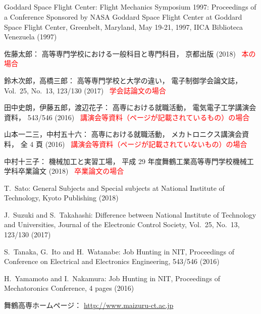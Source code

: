 \begin{center}
\section*{}                      %
\vspace*{-2zh}
\end{center}

\begin{thebibliography}{99}
	Goddard Space Flight Center:
	Flight Mechanics Symposium 1997: Proceedings of a Conference Sponsored by NASA Goddard
	 Space Flight Center at Goddard Space Flight Center, Greenbelt, Maryland, May 19-21, 1997,
	 IICA Biblioteca Venezuela (1997)

	佐藤太郎：
	高等専門学校における一般科目と専門科目，
	京都出版 (2018)
	\textcolor{red}{\quad\cdotfill\ 本の場合}
	
	鈴木次郎，高橋三郎：
	高等専門学校と大学の違い，
	電子制御学会論文誌，
	Vol.~25, No.~13, 123/130 (2017)
	\textcolor{red}{\quad\cdotfill\ 学会誌論文の場合}
	
	田中史朗，伊藤五郎，渡辺花子：
	高専における就職活動，
	電気電子工学講演会資料，
	543/546 (2016)
	\textcolor{red}{\quad\cdotfill\ 講演会等資料（ページが記載されているもの）の場合}
	
	山本一二三，中村五十六：
	高専における就職活動，
	メカトロニクス講演会資料，
	全 4 頁 (2016)
	\textcolor{red}{\quad\cdotfill\ 講演会等資料（ページが記載されていないもの）の場合}
	
	中村十三子：
	機械加工と実習工場，
	平成 29 年度舞鶴工業高等専門学校機械工学科卒業論文 (2018)
	\textcolor{red}{\quad\cdotfill\ 卒業論文の場合}
	
	T.~Sato: 
	General Subjects and Special subjects at National Institute of Technology, 
	Kyoto Publishing (2018)
	
	J.~Suzuki and S.~Takahashi: 
	Difference between National Institute of Technology and Universities, 
	Journal of the Electronic Control Society, 
	Vol.~25, No.~13, 123/130 (2017)
	
	S.~Tanaka, G.~Ito and H.~Watanabe: 
	Job Hunting in NIT, 
	Proceedings of Conference on Electrical and Electronics Engineering, 
	543/546 (2016)
	
	H.~Yamamoto and I.~Nakamura: 
	Job Hunting in NIT, 
	Proceedings of Mechatoronics Conference, 
	4 pages (2016)
	
	舞鶴高専ホームページ：
	\url{http://www.maizuru-ct.ac.jp}
\end{thebibliography}
